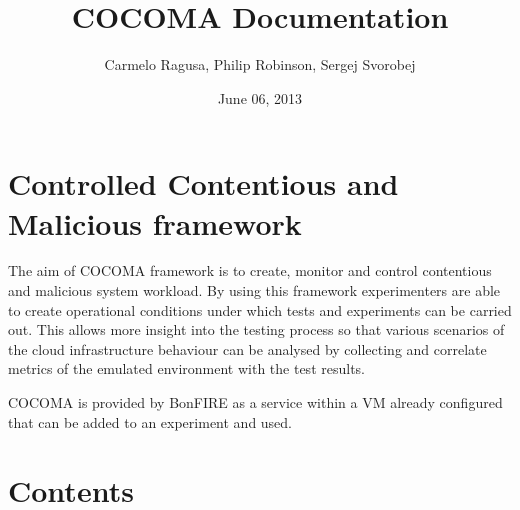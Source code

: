 \documentclass[letterpaper,10pt,english]{sphinxhowto}
\title{COCOMA Documentation}
\date{June 06, 2013}
\author{Carmelo Ragusa, Philip Robinson, Sergej Svorobej}
\begin{document}
\maketitle
\tableofcontents
{}\label{index::doc}



\section{Controlled Contentious and Malicious framework}
\label{index:controlled-contentious-and-malicious-framework}\label{index:cocoma}
The aim of COCOMA framework is to create, monitor and control contentious and malicious system workload. By using this framework experimenters are able to create operational conditions under which tests and experiments can be carried out. This allows more insight into the testing process so that various scenarios of the cloud infrastructure behaviour can be analysed by collecting and correlate metrics of the emulated environment with the test results.

COCOMA is provided by BonFIRE as a service within a VM already configured that can be added to an experiment and used.


\section{Contents}
\label{index:contents}
\end{document}
